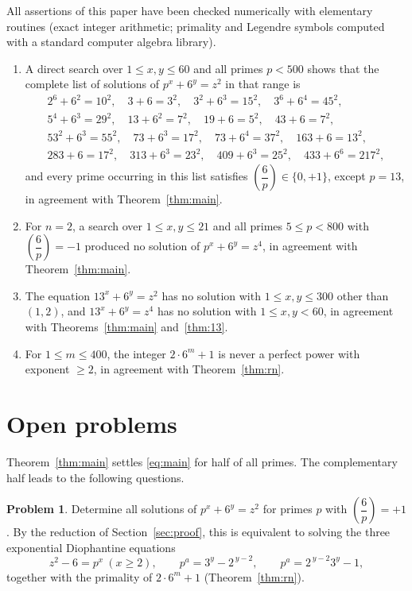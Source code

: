 \documentclass[preprint,12pt]{elsarticle}
\theoremstyle{definition}
\newtheorem{problem}[theorem]{Problem}
\newcommand{\leg}[2]{\left(\dfrac{#1}{#2}\right)}
\begin{document}
All assertions of this paper have been checked numerically with elementary
routines (exact integer arithmetic; primality and Legendre symbols computed
with a standard computer algebra library).

\begin{enumerate}
\item A direct search over $1\leq x,y\leq 60$ and all primes $p<500$ shows
that the complete list of solutions of $p^{x}+6^{y}=z^{2}$ in that range is
\begin{gather*}
2^{6}+6^{2}=10^{2},\quad 3+6=3^{2},\quad 3^{2}+6^{3}=15^{2},\quad
3^{6}+6^{4}=45^{2},\\
5^{4}+6^{3}=29^{2},\quad 13+6^{2}=7^{2},\quad 19+6=5^{2},\quad
43+6=7^{2},\\
53^{2}+6^{3}=55^{2},\quad 73+6^{3}=17^{2},\quad 73+6^{4}=37^{2},\quad
163+6=13^{2},\\
283+6=17^{2},\quad 313+6^{3}=23^{2},\quad 409+6^{3}=25^{2},\quad
433+6^{6}=217^{2},
\end{gather*}
and every prime occurring in this list satisfies $\leg{6}{p}\in\{0,+1\}$,
except $p=13$, in agreement with Theorem~\ref{thm:main}.
\item For $n=2$, a search over $1\leq x,y\leq 21$ and all primes
$5\leq p<800$ with $\leg{6}{p}=-1$ produced no solution of
$p^{x}+6^{y}=z^{4}$, in agreement with Theorem~\ref{thm:main}.
\item The equation $13^{x}+6^{y}=z^{2}$ has no solution with
$1\leq x,y\leq 300$ other than $(1,2)$, and $13^{x}+6^{y}=z^{4}$ has no
solution with $1\leq x,y<60$, in agreement with Theorems~\ref{thm:main}
and~\ref{thm:13}.
\item For $1\leq m\leq 400$, the integer $2\cdot 6^{m}+1$ is never a perfect
power with exponent $\geq 2$, in agreement with Theorem~\ref{thm:rn}.
\end{enumerate}

\section{Open problems}\label{sec:open}

Theorem~\ref{thm:main} settles \eqref{eq:main} for half of all primes. The
complementary half leads to the following questions.

\begin{problem}\label{prob:plus1}
Determine all solutions of $p^{x}+6^{y}=z^{2}$ for primes $p$ with
$\leg{6}{p}=+1$. By the reduction of Section~\ref{sec:proof}, this is
equivalent to solving the three exponential Diophantine equations
\[
z^{2}-6=p^{x}\ (x\geq 2),\qquad
p^{a}=3^{y}-2^{\,y-2},\qquad
p^{a}=2^{\,y-2}3^{y}-1,
\]
together with the primality of $2\cdot 6^{m}+1$ (Theorem~\ref{thm:rn}).
\end{problem}
\end{document}
